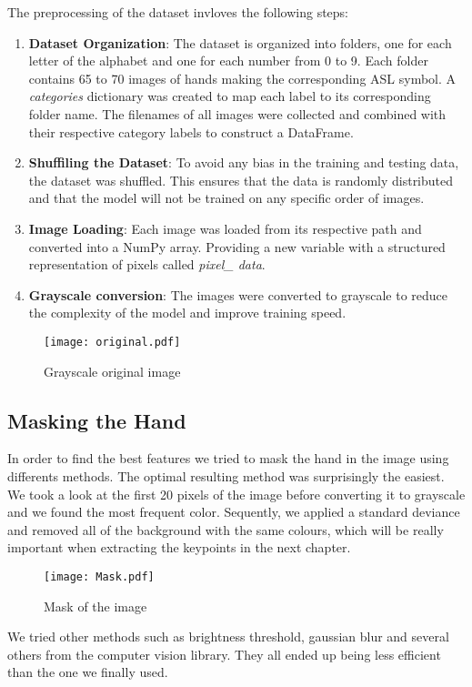 \documentclass[9pt,a4paper,twoside]{tau-class/tau}
\begin{document}
    The preprocessing of the dataset invloves the following steps: 
    \begin{enumerate}
        \item \textbf{Dataset Organization}: The dataset is organized into folders, one for each letter of the alphabet and one for each number from 0 to 9. Each folder contains 65 to 70 images of hands making the corresponding ASL symbol. A \textit{categories} dictionary was created to map each label to its corresponding folder name. The filenames of all images were collected and combined with their respective category labels to construct a DataFrame.
        \item \textbf{Shuffiling the Dataset}: To avoid any bias in the training and testing data, the dataset was shuffled. This ensures that the data is randomly distributed and that the model will not be trained on any specific order of images.
        \item \textbf{Image Loading}: Each image was loaded from its respective path and converted into a NumPy array. Providing a new variable with a structured representation of pixels called \textit{pixel\_ data}.
        \item \textbf{Grayscale conversion}: The images were converted to grayscale to reduce the complexity of the model and improve training speed.
    \end{enumerate}
    \begin{figure}[H]
		\centering
		\texttt{[image: original.pdf]}
		\caption{Grayscale original image}
		\label{fig:original}
	\end{figure}

    \subsection{Masking the Hand}
    In order to find the best features we tried to mask the hand in the image using differents methods. The optimal resulting
    method was surprisingly the easiest. We took a look at the first 20 pixels of the image before converting it to grayscale and we found the most frequent color. Sequently, we applied a
    standard deviance and removed all of the background with the same colours, which will be really important when extracting the keypoints in the next chapter.
    \begin{figure}[H]
		\centering
		\texttt{[image: Mask.pdf]}
		\caption{Mask of the image}
		\label{fig:mask}
	\end{figure}
    \begin{info}
        We tried other methods such as brightness threshold, gaussian blur and several others from the computer vision library. They all ended up 
        being less efficient than the one we finally used.
    \end{info}
		
\end{document}
